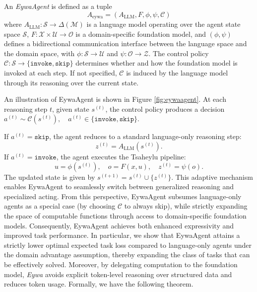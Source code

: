 \begin{tcolorbox}[
  agentscope,
  float,
  floatplacement=h,
  title=\textbf{EywaAgent}
]
\begin{definition}[EywaAgent]
An \textit{EywaAgent} is defined as a tuple
\begin{equation}
A_{\mathrm{eywa}} = (A_{\mathrm{LLM}}, F, \phi, \psi, \mathcal{C})
\end{equation}
where $A_{\mathrm{LLM}} : \mathcal{S} \to \Delta(\mathcal{M})$ is a language model operating over the agent state space $\mathcal{S}$, $F : \mathcal{X} \times \mathcal{U} \to \mathcal{O}$ is a domain-specific foundation model, and $(\phi, \psi)$ defines a bidirectional communication interface between the language space and the domain space, with $\phi : \mathcal{S} \to \mathcal{U}$ and $\psi : \mathcal{O} \to \mathcal{Z}$.
The control policy $\mathcal{C} : \mathcal{S} \to \{\texttt{invoke}, \texttt{skip}\}$ determines whether and how the foundation model is invoked at each step. If not specified, $\mathcal{C}$ is induced by the language model through its reasoning over the current state.
\end{definition}
\end{tcolorbox}

An illustration of EywaAgent is shown in Figure \ref{fig:eywaagent}. At each reasoning step $t$, given state $s^{(t)}$, the control policy produces a decision $ a^{(t)} \sim \mathcal{C}(s^{(t)}), \quad a^{(t)} \in \{ \texttt{invoke}, \texttt{skip} \}$.

If $a^{(t)} = \texttt{skip}$, the agent reduces to a standard language-only reasoning step:
\begin{equation}
z^{(t)} = A_{\mathrm{LLM}}(s^{(t)}).
\end{equation}
If $a^{(t)} = \texttt{invoke}$, the agent executes the Tsaheylu pipeline:
\begin{equation}
u = \phi(s^{(t)}), \quad
o = F(x, u), \quad
z^{(t)} = \psi(o).
\end{equation}
The updated state is given by $s^{(t+1)} = s^{(t)} \cup \{z^{(t)}\}$. This adaptive mechanism enables EywaAgent to seamlessly switch between generalized reasoning and specialized acting.
From this perspective, EywaAgent subsumes language-only agents as a special case (by choosing $\mathcal{C}$ to always skip), while strictly expanding the space of computable functions through access to domain-specific foundation models. Consequently, EywaAgent achieves both enhanced expressivity and improved task performance.
In particular, we show that EywaAgent attains a strictly lower optimal expected task loss compared to language-only agents under the domain advantage assumption, thereby expanding the class of tasks that can be effectively solved.
Moreover, by delegating computation to the foundation model, \textit{Eywa} avoids explicit token-level reasoning over structured data and reduces token usage. Formally, we have the following theorem.


